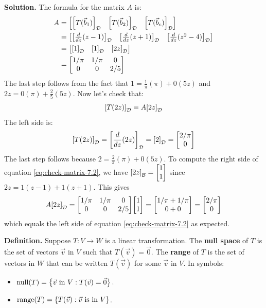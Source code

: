 \documentclass[11pt, letterpaper]{report}
\newenvironment{book}{}{}
\let\originalleft\left
\let\originalright\right
\renewcommand{\left}{\mathopen{}\mathclose\bgroup\originalleft}
\renewcommand{\right}{\aftergroup\egroup\originalright}
\newenvironment{definition}{\begin{bbox}\par\noindent\textbf{Definition. }}
  {\end{bbox}}
\newlength\oldfboxsep%
\newlength\myminiwidth%
\newenvironment{bbox}{%
  \setlength\oldfboxsep\fboxsep
  \setlength{\fboxsep}{.1in}%
  \setlength\myminiwidth\linewidth%
  \addtolength\myminiwidth{-0.2in}%
  \vspace{0.1in}%
  \begin{lrbox}{\bboxbox}\begin{minipage}{\myminiwidth}%
    }{%
    \end{minipage}\end{lrbox}%
  \noindent\fbox{\usebox{\bboxbox}}\vspace{0.1in}\setlength\fboxsep\oldfboxsep%
}
\DeclareMathOperator{\nul}{null}
\DeclareMathOperator{\range}{range}
\newcommand{\bbvec}[2]{
  \begin{bmatrix} #1 \\ #2 \end{bmatrix}
}
\begin{document}
\begin{book}
\textbf{Solution.} The formula for the matrix $A$ is:
\begin{align*}
A &= \begin{bmatrix}
\left[ T(\vec{b}_1) \right]_{\mathcal{D}} & \left[ T(\vec{b}_2) \right]_{\mathcal{D}}  & \left[ T(\vec{b}_c) \right]_{\mathcal{D}} 
\end{bmatrix} \\
&= \begin{bmatrix}
\left[ \frac{d}{dz}(z-1) \right]_{\mathcal{D}} & \left[ \frac{d}{dz}(z+1) \right]_{\mathcal{D}}  & \left[ \frac{d}{dz}(z^2-4) \right]_{\mathcal{D}} 
\end{bmatrix} \\
&= \begin{bmatrix}
\left[ 1 \right]_{\mathcal{D}} & \left[ 1 \right]_{\mathcal{D}}  & \left[ 2z \right]_{\mathcal{D}} 
\end{bmatrix} \\
&=\begin{bmatrix}
1/\pi & 1/\pi & 0 \\
0 & 0 & 2/5
\end{bmatrix}
\end{align*}
The last step follows from the fact that $1 = \frac{1}{\pi}(\pi) + 0(5z)$ and $2z = 0(\pi) + \frac{2}{5}(5z)$. Now let's check that:
\begin{equation}
\label{eq:check-matrix-7.2}
\left[ T(2z) \right]_{\mathcal{D}} = A \left[ 2z \right]_{\mathcal{D}}
\end{equation}
The left side is:
\[\left[ T(2z) \right]_{\mathcal{D}} = \left[ \frac{d}{dz}(2z) \right]_{\mathcal{D}} = \left[ 2 \right]_{\mathcal{D}} = \bbvec{2/\pi}{0}\]
The last step follows because $2 = \frac{2}{\pi}(\pi) + 0(5z)$. To compute the right side of equation \ref{eq:check-matrix-7.2}, we have $\left[ 2z \right]_{\mathcal{B}} = \bbvec{1}{1}$ since $2z = 1(z-1) + 1(z+1)$. This gives
\[A \left[ 2z \right]_{\mathcal{D}} = \begin{bmatrix}
1/\pi & 1/\pi & 0 \\
0 & 0 & 2/5
\end{bmatrix}\bbvec{1}{1} = \bbvec{1/\pi + 1/\pi}{0+0} = \bbvec{2/\pi}{0}\]
which equals the left side of equation \ref{eq:check-matrix-7.2} as expected. \blacksquare
\end{book}

\begin{definition}    
Suppose $T:V \rightarrow W$ is a linear transformation. The \textbf{null space} of $T$ is the set of vectors $\vec{v}$ in $V$ such that $T(\vec{v}) = \vec{0}$. The \textbf{range} of $T$ is the set of vectors in $W$ that can be written $T(\vec{v})$ for some $\vec{v}$ in $V$. In symbols:
\begin{itemize}
\item $\nul (T) = \left\{ \vec{v} \text{ in } V: T(\vec{v}) = \vec{0}\right\}$.
\item $\range (T) = \left\{ T(\vec{v}) : \vec{v} \text{ is in } V \right\}$.
\end{itemize}
\end{definition}
\end{document}
